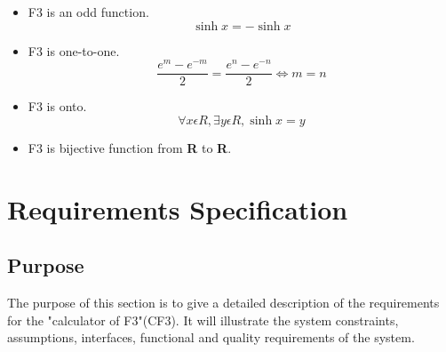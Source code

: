 \documentclass[12pt]{article}
\begin{document}
{\begin{normalsize}
 \begin{itemize}
    \item F3 is an odd function.
    \begin{equation}
        \sinh x = -\sinh x
    \end{equation}
    
    \item F3 is one-to-one.
    \begin{equation}
        \frac{e^{m}-e^{-m}}{2} = \frac{e^{n}-e^{-n}}{2} \Leftrightarrow m = n
    \end{equation}
    
    \item F3 is onto.
    \begin{equation}
        \forall x \epsilon R, \exists y \epsilon R, \sinh x = y
    \end{equation}
        
    \item F3 is bijective function from \textbf{R} to \textbf{R}.
  \end{itemize}



\section{Requirements Specification}
\subsection{Purpose}
The purpose of this section is to give a detailed description of the requirements for the "calculator of F3"(CF3). It will illustrate the system constraints, assumptions, interfaces, functional and quality requirements of the system.


\end{normalsize}}
\end{document}
